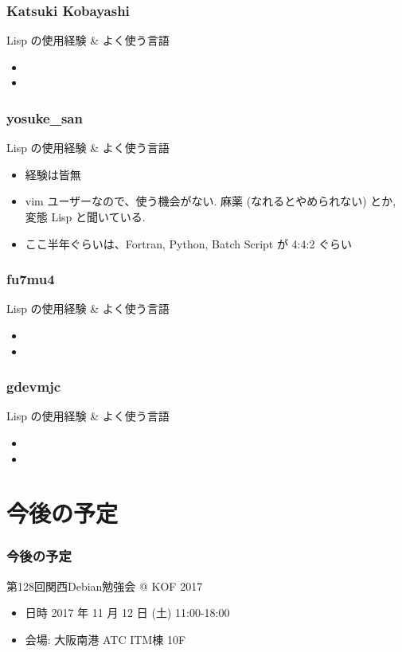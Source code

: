 \documentclass[cjk,dvipdfmx,12pt,compress,%
hyperref={bookmarks=true,bookmarksnumbered=true,bookmarksopen=false,%
colorlinks=false,%
pdftitle={第 120 回 関西 Debian 勉強会},%
pdfauthor={倉敷・のがた・佐々木・かわだ・おおつき},%
pdfsubject={資料},%
}]{beamer}
\begin{document}
\begin{frame}[fragile]
  \frametitle{Katsuki Kobayashi}
  \begin{block}{Lisp の使用経験 \& よく使う言語}
    \begin{itemize}
      \item 
      \item 
    \end{itemize}
  \end{block}
\end{frame}

\begin{frame}[fragile]
  \frametitle{yosuke\_san}
  \begin{block}{Lisp の使用経験 \& よく使う言語}
    \begin{itemize}
      \item 経験は皆無 
      \item vim ユーザーなので、使う機会がない. 麻薬 (なれるとやめられない) とか, 変態 Lisp と聞いている. 
      \item ここ半年ぐらいは、Fortran, Python, Batch Script が 4:4:2 ぐらい
    \end{itemize}
  \end{block}
\end{frame}

\begin{frame}[fragile]
  \frametitle{fu7mu4}
  \begin{block}{Lisp の使用経験 \& よく使う言語}
    \begin{itemize}
      \item 
      \item 
    \end{itemize}
  \end{block}
\end{frame}

\begin{frame}[fragile]
  \frametitle{gdevmjc}
  \begin{block}{Lisp の使用経験 \& よく使う言語}
    \begin{itemize}
      \item 
      \item 
    \end{itemize}
  \end{block}
\end{frame}




\section{今後の予定}
\begin{frame}[fragile]
  \frametitle{今後の予定}
  \begin{block}{第128回関西Debian勉強会 @ KOF 2017}
    \begin{itemize}
    \item 日時 2017 年 11 月 12 日 (土) 11:00-18:00
    \item 会場: 大阪南港 ATC ITM棟 10F
    \end{itemize}
  \end{block}
\end{frame}
\end{document}
